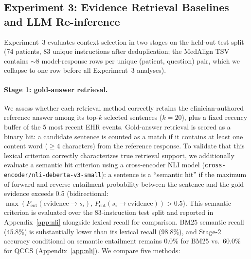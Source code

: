 \documentclass{article}
\begin{document}
\subsection{Experiment 3: Evidence Retrieval Baselines and LLM Re-inference}
\label{sec:exp3}

Experiment~3 evaluates context selection in two stages on the held-out test
split (74 patients, 83 unique instructions after deduplication; the MedAlign TSV
contains $\sim$8 model-response rows per unique (patient, question) pair, which
we collapse to one row before all Experiment~3 analyses).

\paragraph{Stage 1: gold-answer retrieval.} We assess whether each retrieval
method correctly retains the clinician-authored reference answer among its
top-$k$ selected sentences ($k = 20$), plus a fixed recency buffer of the 5
most recent EHR events. Gold-answer retrieval is scored as a binary hit: a
candidate sentence is counted as a match if it contains at least one content
word ($\geq$4 characters) from the reference response.
To validate that this lexical criterion correctly characterizes true retrieval
support, we additionally evaluate a semantic hit criterion using a cross-encoder
NLI model (\texttt{cross-encoder/nli-deberta-v3-small}): a sentence is a
``semantic hit'' if the maximum of forward and reverse entailment probability
between the sentence and the gold evidence exceeds 0.5
(bidirectional: $\max(P_{\mathrm{ent}}(\text{evidence}\to s_i),\, P_{\mathrm{ent}}(s_i\to\text{evidence})) > 0.5$).
This semantic criterion is evaluated over the 83-instruction test split and
reported in Appendix~\ref{app:nli} alongside lexical recall for comparison.
BM25 semantic recall (45.8\%) is substantially lower than its lexical recall (98.8\%),
and Stage-2 accuracy conditional on semantic entailment remains 0.0\% for BM25
vs.\ 60.0\% for QCCS (Appendix~\ref{app:nli}). We compare five methods:
\end{document}
